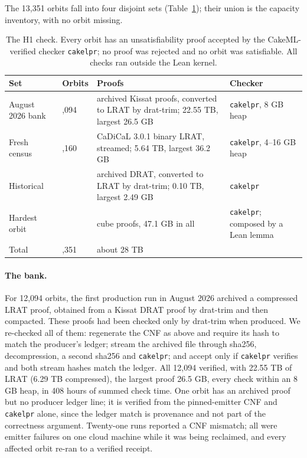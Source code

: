 \documentclass{anvil-paper}
\newcommand{\cakelpr}{\texttt{cake\textunderscore lpr}}
\theoremstyle{definition}
\begin{document}
The 13,351 orbits fall into four disjoint sets (Table~\ref{tab:h1}); their union is the capacity inventory, with no orbit missing.

\begin{table}[htbp]
\centering\small
\caption{The H1 check. Every orbit has an unsatisfiability proof accepted by the CakeML-verified checker \cakelpr{}; no proof was rejected and no orbit was satisfiable. All checks ran outside the Lean kernel.}
\label{tab:h1}
\begin{tabularx}{\textwidth}{@{}>{\raggedright\arraybackslash}p{}>{\raggedleft\arraybackslash}p{}>{\raggedright\arraybackslash}X>{\raggedright\arraybackslash}p{}@{}}
\toprule
Set & Orbits & Proofs & Checker \\
\midrule
August 2026 bank & 12,094 & archived Kissat proofs, converted to LRAT by drat-trim; 22.55 TB, largest 26.5 GB & \cakelpr{}, 8 GB heap \\
Fresh census & 1,160 & CaDiCaL 3.0.1 binary LRAT, streamed; 5.64 TB, largest 36.2 GB & \cakelpr{}, 4--16 GB heap \\
Historical & 96 & archived DRAT, converted to LRAT by drat-trim; 0.10 TB, largest 2.49 GB & \cakelpr{} \\
Hardest orbit & 1 & 36 cube proofs, 47.1 GB in all & \cakelpr{}; composed by a Lean lemma \\
\midrule
Total & 13,351 & about 28 TB & \\
\bottomrule
\end{tabularx}
\end{table}

\paragraph{The bank.} For 12,094 orbits, the first production run in August 2026 archived a compressed LRAT proof, obtained from a Kissat DRAT proof by drat-trim and then compacted. These proofs had been checked only by drat-trim when produced. We re-checked all of them: regenerate the CNF as above and require its hash to match the producer's ledger; stream the archived file through sha256, decompression, a second sha256 and \cakelpr{}; and accept only if \cakelpr{} verifies and both stream hashes match the ledger. All 12,094 verified, with 22.55 TB of LRAT (6.29 TB compressed), the largest proof 26.5 GB, every check within an 8 GB heap, in 408 hours of summed check time. One orbit has an archived proof but no producer ledger line; it is verified from the pinned-emitter CNF and \cakelpr{} alone, since the ledger match is provenance and not part of the correctness argument. Twenty-one runs reported a CNF mismatch; all were emitter failures on one cloud machine while it was being reclaimed, and every affected orbit re-ran to a verified receipt.
\end{document}
